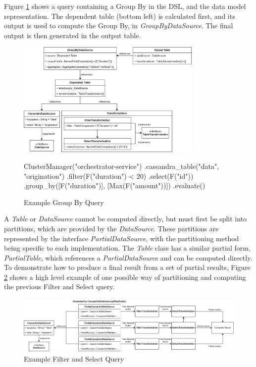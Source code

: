 Figure \ref{fig:group-by-query} shows a query containing a Group By in the DSL, and the data model representation. The dependent table (bottom left) is calculated first, and its output is used to compute the Group By, in \textit{GroupByDataSource}. The final output is then generated in the output table.

\begin{figure}[htp]
	\centering
	\includegraphics[width=0.8\textwidth]{chapters/diagrams/implementation/group-by-query}
	\linebreak
	\begin{python}
ClusterManager("orchestrator-service")
.cassandra_table("data", "origination")
.filter(F("duration") < 20)
.select(F("id"))
.group_by([F("duration")], [Max(F("amount"))])
.evaluate()
	\end{python}
	\caption{Example Group By Query}
	\label{fig:group-by-query}
\end{figure}

A \textit{Table} or \textit{DataSource} cannot be computed directly, but must first be split into partitions, which are provided by the \textit{DataSource}. These partitions are represented by the interface \textit{PartialDataSource}, with the partitioning method being specific to each implementation. The \textit{Table} class has a similar partial form, \textit{PartialTable}, which references a \textit{PartialDataSource} and can be computed directly. To demonstrate how to produce a final result from a set of partial results, Figure \ref{fig:partial-filter-select-query} shows a high level example of one possible way of partitioning and computing the previous Filter and Select query.

\begin{figure}[h]
	\centering
	\includegraphics[width=\textwidth]{chapters/diagrams/implementation/partial-filter-select-query}
	\caption{Example Filter and Select Query}
	\label{fig:partial-filter-select-query}
\end{figure}




